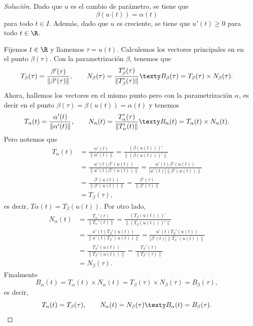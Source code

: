 \documentclass[a4,11pt]{aleph-notas}
\begin{document}
\begin{proof}[Solución]
Dado que $u$ es el cambio de parámetro, se tiene que
    \[
        \beta(u(t))=\alpha(t)
    \]
    para todo $t\in I$. Además, dado que $u$ es creciente, se tiene que $u'(t)\geq 0$ para todo $t\in\R$.
    
    Fijemos $t\in \R$ y llamemos $\tau=u(t)$. Calculemos los vectores principales en en el punto $\beta(\tau)$. Con la parametrización $\beta$, tenemos que
    \[
        T_\beta(\tau)= \frac{\beta'(\tau)}{\|\beta'(\tau)\|},
        \qquad
        N_\beta(\tau)= \frac{T_\beta'(\tau)}{\|T_\beta'(\tau)\|}
        \texty
        B_\beta(\tau)= T_\beta(\tau)\times N_\beta(\tau).
    \]
    Ahora, hallemos los vectores en el mismo punto pero con la parametrización $\alpha$, es decir en el punto $\beta(\tau)=\beta(u(t))=\alpha(t)$ y tenemos
    \[
        T_\alpha(t)= \frac{\alpha'(t)}{\|\alpha'(t)\|},
        \qquad
        N_\alpha(t)= \frac{T_\alpha'(\tau)}{\|T_\alpha'(t)\|}
        \texty
        B_\alpha(t)= T_\alpha(t)\times N_\alpha(t).
    \]
    Pero notemos que
    \begin{align*}
        T_\alpha(t)
            & = \frac{\alpha'(t)}{\|\alpha'(t)\|} = \frac{(\beta(u(t)))'}{\|(\beta(u(t)))'\|}\\[1mm]
            & = \frac{u'(t)\beta'(u(t))}{\|u'(t)\beta'(u(t))\|} = \frac{u'(t)\beta'(u(t))}{|u'(t)|\|\beta'(u(t))\|}\\[1mm]
            & = \frac{\beta'(u(t))}{\|\beta'(u(t))\|} = \frac{\beta'(\tau)}{\|\beta'(\tau)\|}\\[1mm]
            & = T_\beta(\tau),
    \end{align*}
    es decir, $T\alpha(t)=T_\beta(u(t))$. Por otro lado, 
    \begin{align*}
        N_\alpha(t)
            & = \frac{T_\alpha'(t)}{\|T_\alpha'(t)\|} = \frac{(T_\beta(u(t)))'}{\|(T_\beta(u(t)))'\|}\\[1mm]
            & = \frac{u'(t)T_\beta'(u(t))}{\|u'(t)T_\beta'(u(t))\|} = \frac{u'(t)T_\beta'(u(t))}{|\beta'(t)|\|T_\beta'(u(t))\|}\\[1mm]
            & = \frac{T_\beta'(u(t))}{\|T_\beta'(u(t))\|} = \frac{T_\beta'(\tau)}{\|T_\beta'(\tau)\|}\\[1mm]
            &= N_\beta(\tau).
    \end{align*}
    Finalmente
    \[
        B_\alpha(t)= T_\alpha(t)\times N_\alpha(t) 
        = T_\beta(\tau)\times N_\beta(\tau)=B_\beta(\tau),
    \]
    es decir,
    \[
        T_\alpha(t)= T_\beta(\tau),
        \qquad
        N_\alpha(t)= N_\beta(\tau)
        \texty
        B_\alpha(t)= B_\beta(\tau).\qedhere
    \]
\end{proof}
\end{document}
